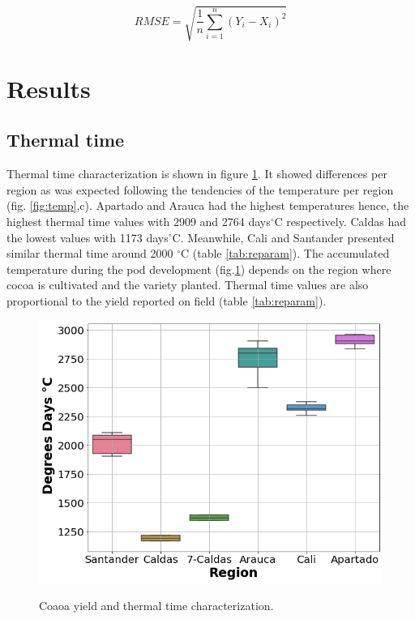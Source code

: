 \documentclass[gene,journal,article,submit,moreauthors,pdftex]{Definitions/mdpi}
\begin{document}
\begin{equation}
RMSE= \sqrt{\frac{1}{n}  \sum_{i=1}^{n} (Y_{i}-X_{i})^{2} } 
\label{equ:RMSE}
\end{equation}



\section{Results}

\subsection{Thermal time }
Thermal time characterization is shown in figure \ref{fig:ttbox}. It showed differences per region as was expected following the tendencies of the temperature per region (fig. \ref{fig:temp},c). Apartado and Arauca had the highest temperatures hence, the highest thermal time values with 2909 and 2764 days$^\circ$C  respectively. Caldas had the lowest values with 1173 days$^\circ$C. Meanwhile, Cali and Santander presented similar thermal time around 2000 $^\circ$C (table \ref{tab:reparam}). The accumulated temperature during the pod development (fig.\ref{fig:ttbox}) depends on the region where cocoa is cultivated and the variety planted. Thermal time values are also proportional to the yield reported on field (table \ref{tab:reparam}).\\

\begin{figure}[h!]
	\centering
	\includegraphics[scale=0.3]{images/ttbbox.png}\\
	\caption{\footnotesize {Coaoa yield and thermal time characterization.\\}}
	\label{fig:ttbox}
\end{figure}
\end{document}
